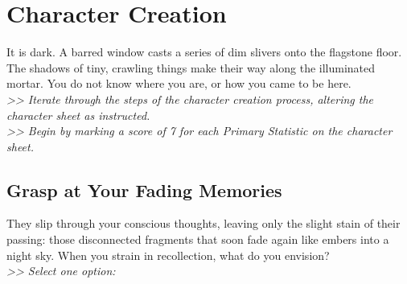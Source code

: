 \section{Character Creation}
\label{chargen}
\hypertarget{chargen}{}
It is dark. A barred window casts a series of dim slivers onto the flagstone floor. The shadows of tiny, crawling things make their way along the illuminated mortar. You do not know where you are, or how you came to be here.\\
\emph{>> Iterate through the steps of the character creation process, altering the character sheet as instructed.\\
>> Begin by marking a score of 7 for each Primary Statistic on the character sheet.}

\subsection*{Grasp at Your Fading Memories}
They slip through your conscious thoughts, leaving only the slight stain of their passing: those disconnected fragments that soon fade again like embers into a night sky. When you strain in recollection, what do you envision?\\
\emph{>> Select one option:}

